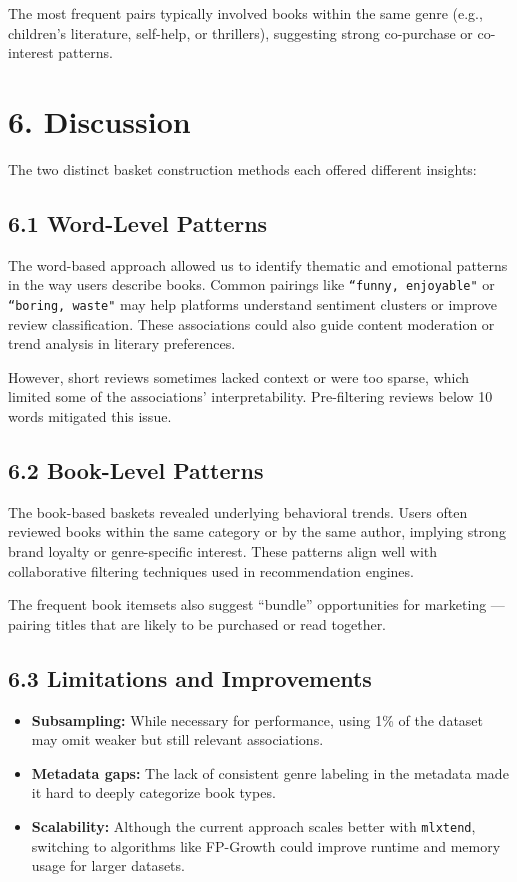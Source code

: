 \documentclass{article}
\begin{document}
The most frequent pairs typically involved books within the same genre (e.g., children’s literature, self-help, or thrillers), suggesting strong co-purchase or co-interest patterns.



\section*{6. Discussion}

The two distinct basket construction methods each offered different insights:

\subsection*{6.1 Word-Level Patterns}
The word-based approach allowed us to identify thematic and emotional patterns in the way users describe books. Common pairings like \texttt{``funny, enjoyable"} or \texttt{``boring, waste"} may help platforms understand sentiment clusters or improve review classification. These associations could also guide content moderation or trend analysis in literary preferences.

However, short reviews sometimes lacked context or were too sparse, which limited some of the associations’ interpretability. Pre-filtering reviews below 10 words mitigated this issue.

\subsection*{6.2 Book-Level Patterns}
The book-based baskets revealed underlying behavioral trends. Users often reviewed books within the same category or by the same author, implying strong brand loyalty or genre-specific interest. These patterns align well with collaborative filtering techniques used in recommendation engines.

The frequent book itemsets also suggest “bundle” opportunities for marketing — pairing titles that are likely to be purchased or read together.

\subsection*{6.3 Limitations and Improvements}
\begin{itemize}
    \item \textbf{Subsampling:} While necessary for performance, using 1\% of the dataset may omit weaker but still relevant associations.
    \item \textbf{Metadata gaps:} The lack of consistent genre labeling in the metadata made it hard to deeply categorize book types.
    \item \textbf{Scalability:} Although the current approach scales better with \texttt{mlxtend}, switching to algorithms like FP-Growth could improve runtime and memory usage for larger datasets.
    
\end{itemize}
\end{document}
